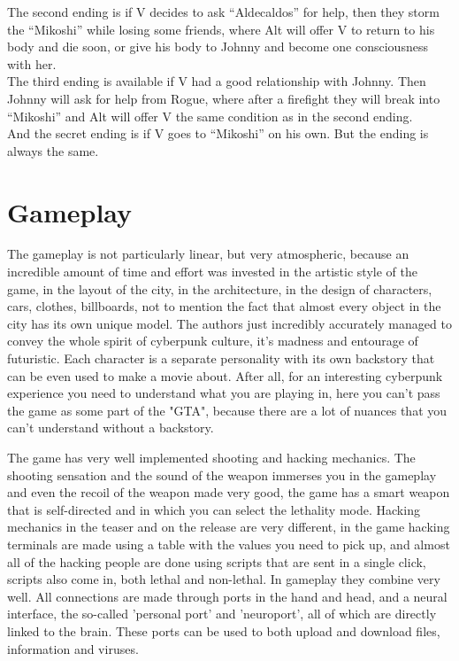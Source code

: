 \documentclass[10pt,twoside,english,a4paper]{article}
\begin{document}
The second ending is if V decides to ask “Aldecaldos” for help, then they storm the “Mikoshi” while losing some friends, where Alt will offer V to  return to his body and die soon, or give his body to Johnny and become one consciousness with her.\\
The third ending is available if V had a good relationship with Johnny. Then Johnny will ask for help from Rogue, where after a firefight they will break into “Mikoshi” and Alt will offer V the same condition as in the second ending.\\
And the secret ending is if V goes to “Mikoshi” on his own. But the ending is always the same.
\section{Gameplay}\label{gameplay}
	The gameplay is not particularly linear, but very atmospheric, because an incredible amount of time and effort was invested in the artistic style of the game, in the layout of the city, in the
architecture, in the design of characters, cars, clothes, billboards, not to mention the fact that almost every object in the city has its own unique model. The authors just incredibly accurately managed to convey the whole spirit of cyberpunk culture, it’s madness and entourage of futuristic. Each character is a separate personality with its own backstory that can be even used to make a movie about. After all, for an interesting cyberpunk experience you need to understand what you are playing in, here you can't pass the game as some part of the "GTA", because there are a lot of nuances that you can't understand without a backstory.

	The game has very well implemented shooting and hacking mechanics. The shooting sensation and the sound of the weapon immerses you in the gameplay and even the recoil of the weapon made very good, the game has a smart weapon that is self-directed and in which you can select the lethality mode. Hacking mechanics in the teaser and on the release are very different, in the game hacking terminals are made using a table with the values you need to pick up, and almost all of the hacking people are done using scripts that are sent in a single click, scripts also come in, both lethal and non-lethal. In gameplay they combine very well. All connections are made through ports in the hand and head, and a neural interface, the so-called 'personal port' and 'neuroport', all of which are directly linked to the brain. These ports can be used to both upload and download files, information and viruses.
\end{document}
